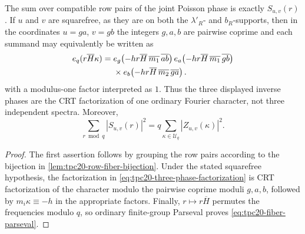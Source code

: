 \begin{theorem}
\label{thm:tpc20-fiber-DFT}
The sum over compatible row pairs of the joint Poisson phase is exactly
\(S_{u,v}(r)\).  If \(u\) and \(v\) are squarefree, as they are on both
the \(\lambda'_R\)- and \(b_R\)-supports, then in the coordinates
\(u=ga\), \(v=gb\) the integers \(g,a,b\) are pairwise coprime and each
summand may equivalently be written as
\begin{align}
 e_q(r\overline H\kappa)
 ={}&e_g\!\left(-hr\overline H\,\overline{m_1}\,
                 \overline{ab}\right)
 e_a\!\left(-hr\overline H\,\overline{m_1}\,
                 \overline{gb}\right)
 \notag\\
 &\times
 e_b\!\left(-hr\overline H\,\overline{m_2}\,
                 \overline{ga}\right).
 \label{eq:tpc20-three-phase-factorization}
\end{align}
with a modulus-one factor interpreted as \(1\).
Thus the three displayed inverse phases are the CRT factorization of one
ordinary Fourier character, not three independent spectra.  Moreover,
\begin{equation}
 \boxed{
 \sum_{r\bmod q}|S_{u,v}(r)|^2
 =q\sum_{\kappa\in\mathcal U_q}|Z_{u,v}(\kappa)|^2.}
 \label{eq:tpc20-fiber-parseval}
\end{equation}
\end{theorem}

\begin{proof}
The first assertion follows by grouping the row pairs according to the
bijection in \cref{lem:tpc20-row-fiber-bijection}.  Under the stated
squarefree hypothesis, the factorization in
\eqref{eq:tpc20-three-phase-factorization} is CRT factorization of the
character modulo the pairwise coprime moduli \(g,a,b\), followed by
\(m_i\kappa\equiv-h\) in the appropriate factors.  Finally,
\(r\mapsto r\overline H\) permutes the frequencies modulo \(q\), so
ordinary finite-group Parseval proves \eqref{eq:tpc20-fiber-parseval}.
\end{proof}

